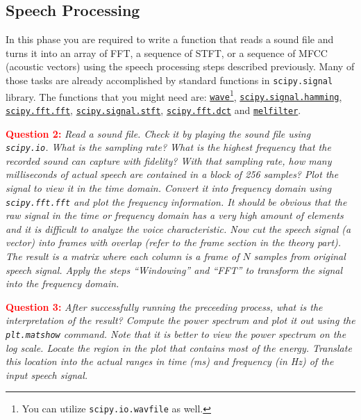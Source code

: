 \documentclass{article}
\begin{document}
\subsection{Speech Processing}
In this phase you are required to write a function that reads a sound file and turns it into an array of FFT, a sequence of STFT, or a sequence of MFCC (acoustic vectors) using the speech processing steps described previously. Many of those tasks are already accomplished by standard functions in \texttt{scipy.signal} library.  The functions that you might need are: \href{https://docs.python.org/3/library/wave.html}{\texttt{wave}}\footnote{You can utilize \texttt{scipy.io.wavfile} as well.}, \href{https://docs.scipy.org/doc/scipy-0.19.1/reference/generated/scipy.signal.hamming.html}{\texttt{scipy.signal.hamming}}, \href{https://docs.scipy.org/doc/scipy/reference/generated/scipy.fft.fft.html#scipy.fft.fft}{\texttt{scipy.fft.fft}}, \href{https://docs.scipy.org/doc/scipy/reference/generated/scipy.signal.stft.html}{\texttt{scipy.signal.stft}}, \href{https://docs.scipy.org/doc/scipy/reference/generated/scipy.fft.dct.html}{\texttt{scipy.fft.dct}} and \href{https://pytorch.org/audio/main/tutorials/audio_feature_extractions_tutorial.html#mel-filter-bank}{\texttt{melfilter}}.  

\textcolor{red}{\textbf{Question 2:}} \textit{Read a sound file.  Check it by playing the sound file using \texttt{scipy.io}.  What is the sampling rate?  What is the highest frequency that the recorded sound can capture with fidelity? With that sampling rate, how many milliseconds of actual speech are contained in a block of 256 samples? Plot the signal to view it in the time domain. Convert it into frequency domain using \texttt{scipy.fft.fft} and plot the frequency information. It should be obvious that the raw signal in the time or frequency domain has a very high amount of elements and it is difficult to analyze the voice characteristic.
Now cut the speech signal (a vector) into frames with overlap (refer to the frame section in the theory part).  The result is a matrix where each column is a frame of $N$ samples from original speech signal.  Apply the steps “Windowing” and “FFT” to transform the signal into the frequency domain.}

\textcolor{red}{\textbf{Question 3:}} \textit{After successfully running the preceeding process, what is the interpretation of the result?  Compute the power spectrum and plot it out using the \texttt{plt.matshow} command.  Note that it is better to view the power spectrum on the log scale.  Locate the region in the plot that contains most of the energy.  Translate this location into the actual ranges in time (ms) and frequency (in Hz) of the input speech signal.}
\end{document}
